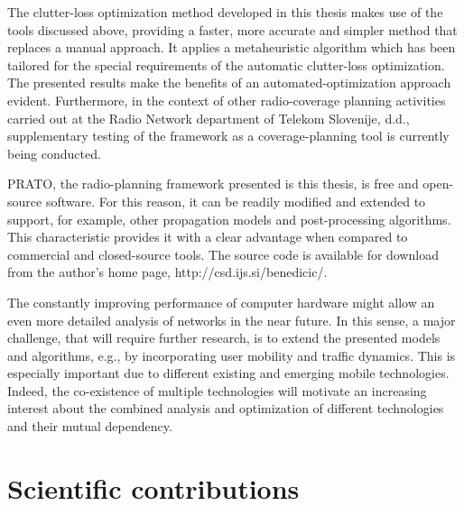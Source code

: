 The clutter-loss optimization method developed in this thesis makes
use of the tools discussed above, providing a faster, more accurate
and simpler method that replaces a manual approach. It applies a metaheuristic
algorithm which has been tailored for the special requirements of
the automatic clutter-loss optimization. The presented results make
the benefits of an automated-optimization approach evident. Furthermore,
in the context of other radio-coverage planning activities carried
out at the Radio Network department of Telekom Slovenije, d.d., supplementary
testing of the framework as a coverage-planning tool is currently
being conducted.

PRATO, the radio-planning framework presented is this thesis, is free
and open-source software. For this reason, it can be readily modified
and extended to support, for example, other propagation models and
post-processing algorithms. This characteristic provides it with a
clear advantage when compared to commercial and closed-source tools.
The source code is available for download from the author's home page,
http://csd.ijs.si/benedicic/.

The constantly improving performance of computer hardware might allow
an even more detailed analysis of networks in the near future. In
this sense, a major challenge, that will require further research,
is to extend the presented models and algorithms, e.g., by incorporating
user mobility and traffic dynamics. This is especially important due
to different existing and emerging mobile technologies. Indeed, the
co-existence of multiple technologies will motivate an increasing
interest about the combined analysis and optimization of different
technologies and their mutual dependency.


\section{Scientific contributions}

